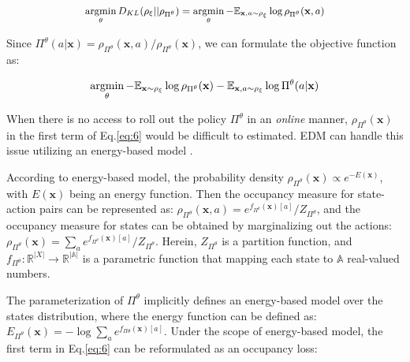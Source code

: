 \documentclass{article}
\DeclareMathOperator*{\argmin}{argmin}
\begin{document}
\vspace{-0.2cm}
\begin{align} 
\small
    \begin{split}
    \argmin_{\theta} D_{KL}(\rho_{\xi}||\rho_{\Pi^{\theta}}) = \argmin_{\theta} -\mathbb{E}_{\mathbf{x},a \sim \rho_{\xi}} \log \rho_{\Pi^{\theta}}(\mathbf{x},a)
    \end{split}
\end{align}


Since $\Pi^{\theta}(a|\mathbf{x}) = \rho_{\Pi^{\theta}}(\mathbf{x},a)/\rho_{\Pi^{\theta}}(\mathbf{x})$, we can formulate the objective function as: 

\vspace{-0.2cm}
\begin{equation}
\small
\label{eq:6}
    \argmin_{\theta} - \mathbb{E}_{\mathbf{x} \sim \rho_{\xi}} \log \rho_{\Pi^{\theta}}(\mathbf{x}) - \mathbb{E}_{\mathbf{x},a \sim \rho_{\xi}} \log \Pi^{\theta}(a|\mathbf{x}) 
\end{equation} 

\noindent When there is no access to roll out the policy $\Pi^{\theta}$ in an \emph{online} manner, $\rho_{\Pi^{\theta}}(\mathbf{x})$ in the first term of Eq.\eqref{eq:6} would be difficult to estimated. EDM can handle this issue utilizing an energy-based model \cite{grathwohl2019your}.


According to energy-based model, the probability density $\rho_{\Pi^{\theta}}(\mathbf{x}) \propto e^{-E(\mathbf{x})}$, with $E(\mathbf{x})$ being an energy function. 
Then the occupancy measure for state-action pairs can be represented as:  $\rho_{\Pi^{\theta}}(\mathbf{x},a) = e^{f_{\Pi^{\theta}}(\mathbf{x}) [a]} / Z_{\Pi^{\theta}}$, and the occupancy measure for states can be obtained by marginalizing out the actions: $\rho_{\Pi^{\theta}}(\mathbf{x}) = \sum_{a} e^{f_{\Pi^{\theta}}(\mathbf{x}) [a]} / Z_{\Pi^{\theta}}$. Herein, $Z_{\Pi^{\theta}}$ is a partition function, and $f_{\Pi^{\theta}}: \mathbb{R}^{|X|} \rightarrow \mathbb{R}^{\mathbb{|A|}}$ is a parametric function that mapping each state to $\mathbb{A}$ real-valued numbers. 



The parameterization of $\Pi^{\theta}$ implicitly defines an energy-based model over the states distribution, where the energy function can be defined as: $E_{\Pi^{\theta}}(\mathbf{x}) = -\log \sum_{a} e^{f_{\Pi\theta}(\mathbf{x})[a]}$. 
Under the scope of energy-based model, the first term in Eq.\eqref{eq:6} can be reformulated as an occupancy loss: 
\end{document}
